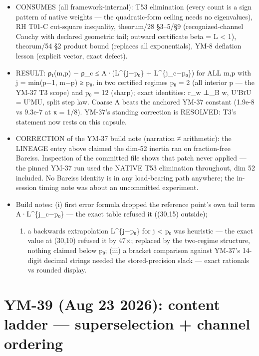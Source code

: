 \begin{itemize}
\tightlist
\item
  CONSUMES (all framework-internal): T53 elimination (every count is a
  sign pattern of native weights --- the quadratic-form ceiling needs no
  eigenvalues), RH T01-C cut-square inequality, theorum/28 §3--5/§9
  (recognized-channel Cauchy with declared geometric tail; outward
  certificate beta = L \textless{} 1), theorum/54 §2 product bound (replaces all
  exponentials), YM-8 deflation lesson (explicit vector, exact defect).
\item
  RESULT: \textbar ρ₁(m,p) − ρ\_c\textbar{} ≤ A·(L\^{}\{j−p₀\} + L\^{}\{j\_c−p₀\}) for ALL m,p with
  j = min(p−1, m−p) ≥ p₀, in two certified regimes p₀ = 2 (all interior
  p --- the YM-37 T3 scope) and p₀ = 12 (sharp); exact identities:
  r\_w ⊥\_B w, U'BτU = U'MU, split step law. Coarse A beats the anchored
  YM-37 constant (1.9e-8 vs 9.3e-7 at κ = 1/8). YM-37's standing
  correction is RESOLVED: T3's statement now rests on this capsule.
\item
  CORRECTION of the YM-37 build note (narration ≠ arithmetic): the
  LINEAGE entry above claimed the dim-52 inertia ran on fraction-free
  Bareiss. Inspection of the committed file shows that patch never
  applied --- the pinned YM-37 run used the NATIVE T53 elimination
  throughout, dim 52 included. No Bareiss identity is in any
  load-bearing path anywhere; the in-session timing note was about an
  uncommitted experiment.
\item
  Build notes: (i) first error formula dropped the reference point's own
  tail term A·L\^{}\{j\_c−p₀\} --- the exact table refused it ((30,15) outside);

  \begin{enumerate}
  \def\labelenumi{(\roman{enumi})}
  \setcounter{enumi}{1}
  \tightlist
  \item
    a backwards extrapolation L\^{}\{j−p₀\} for j \textless{} p₀ was heuristic --- the
    exact value at (30,10) refused it by 47×; replaced by the two-regime
    structure, nothing claimed below p₀; (iii) a bracket comparison
    against YM-37's 14-digit decimal strings needed the stored-precision
    slack --- exact rationals vs rounded display.
  \end{enumerate}
\end{itemize}

\hypertarget{ym-39-aug-23-2026-content-ladder-superselection-channel-ordering}{%
\section{YM-39 (Aug 23 2026): content ladder --- superselection + channel ordering}\label{ym-39-aug-23-2026-content-ladder-superselection-channel-ordering}}

